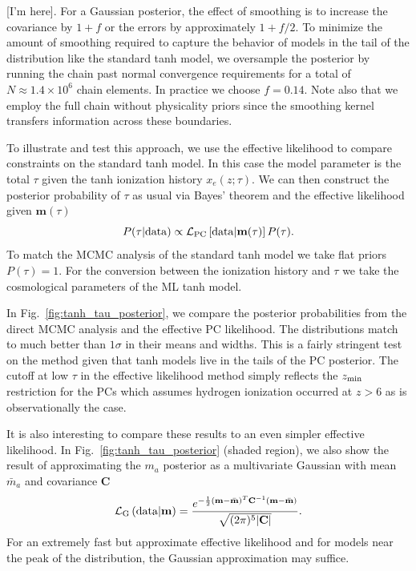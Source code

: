 \documentclass[prd,twocolumn,amsmath,amssymb,floatfix,superscriptaddress,nofootinbib]{revtex4-1}
\begin{document}
[I'm here].
For a Gaussian posterior, the effect of smoothing
is to increase the covariance by $1+f$ or the errors by approximately $1+f/2$.   
To minimize the amount of smoothing required to capture the behavior of models
in the tail of the distribution like the standard tanh model, we oversample the posterior by running  the 
chain past normal convergence requirements for a total of $N\approx 1.4 \times 10^6$ chain elements.
In practice we choose $f=0.14$.  Note also that we employ the full chain without physicality priors since the smoothing kernel transfers information across these boundaries.

To illustrate and test this approach, we  use the effective likelihood to compare constraints on
the 
standard tanh model. In this case the model parameter is the total $\tau$ 
given the tanh ionization history $x_e(z; \tau)$.   We can then construct the posterior probability of
$\tau$ as usual via Bayes' theorem and the effective likelihood given $\mathbf{m}(\tau)$
\begin{equation}
P(\tau| {\rm data}) \propto {\cal L}_{\rm PC}\left[ {\rm data}|\mathbf{m}(\tau) \right] P(\tau).
\end{equation}
To match the MCMC analysis of the standard tanh model we take flat priors $P(\tau)=1$.   
For the conversion between the ionization history and $\tau$ we take the cosmological parameters
of the ML tanh model.  

In Fig.~\ref{fig:tanh_tau_posterior}, we compare the posterior probabilities from the direct MCMC
analysis and the effective PC likelihood.   The distributions match to much better than $1\sigma$
in their means and widths.    This is a fairly stringent test on the method given that 
tanh models live in the tails of the PC posterior.  
 The cutoff at low $\tau$ in the effective likelihood method
 simply reflects the $z_{\rm min}$ restriction for the PCs which assumes hydrogen ionization occurred at $z>6$ as is observationally the case.  
 
It is also interesting to compare these results to an even simpler effective likelihood.  In
Fig.~\ref{fig:tanh_tau_posterior} (shaded region), we also show the result of approximating
 the $m_a$ posterior as a multivariate Gaussian with mean $\bar m_a$
 and covariance $\mathbf{C}$
 \begin{equation}
 {\cal L}_{\rm G}\left({\rm data}|\mathbf{m} \right) = \frac{ e^{-\frac{1}{2} ({\bf m}-\bar{\bf m})^T {\bf C}^{-1} ({\bf m}-\bar{\bf m}) } }{\sqrt{(2\pi)^5 | \mathbf{C}| }}
.
 \label{eq:gaussian}
 \end{equation}
 For an extremely fast but approximate effective likelihood and for models near the peak
 of the distribution, the Gaussian approximation may suffice.
 
\end{document}
